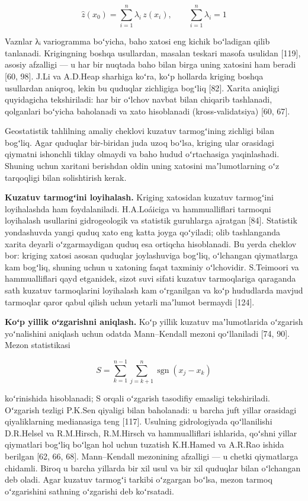 \begin{equation}\tag{1.4}
\hat{z}(x_0) = \sum_{i=1}^{n} \lambda_i \, z(x_i), \qquad \sum_{i=1}^{n} \lambda_i = 1
\end{equation}

Vaznlar λᵢ variogramma boʻyicha, baho xatosi eng kichik boʻladigan qilib
tanlanadi. Krigingning boshqa usullardan, masalan teskari masofa
usulidan {[}119{]}, asosiy afzalligi --- u har bir nuqtada baho bilan
birga uning xatosini ham beradi {[}60, 98{]}. J.Li va A.D.Heap sharhiga
koʻra, koʻp hollarda kriging boshqa usullardan aniqroq, lekin bu
quduqlar zichligiga bogʻliq {[}82{]}. Xarita aniqligi quyidagicha
tekshiriladi: har bir oʻlchov navbat bilan chiqarib tashlanadi,
qolganlari boʻyicha baholanadi va xato hisoblanadi (kross-validatsiya)
{[}60, 67{]}.

Geostatistik tahlilning amaliy cheklovi kuzatuv tarmogʻining zichligi
bilan bogʻliq. Agar quduqlar bir-biridan juda uzoq boʻlsa, kriging ular
orasidagi qiymatni ishonchli tiklay olmaydi va baho hudud oʻrtachasiga
yaqinlashadi. Shuning uchun xaritani berishdan oldin uning xatosini
maʼlumotlarning oʻz tarqoqligi bilan solishtirish kerak.

\textbf{Kuzatuv tarmogʻini loyihalash.} Kriging xatosidan kuzatuv
tarmogʻini loyihalashda ham foydalaniladi. H.A.Loáiciga va
hammualliflari tarmoqni loyihalash usullarini gidrogeologik va statistik
guruhlarga ajratgan {[}84{]}. Statistik yondashuvda yangi quduq xato eng
katta joyga qoʻyiladi; olib tashlanganda xarita deyarli oʻzgarmaydigan
quduq esa ortiqcha hisoblanadi. Bu yerda cheklov bor: kriging xatosi
asosan quduqlar joylashuviga bogʻliq, oʻlchangan qiymatlarga kam
bogʻliq, shuning uchun u xatoning faqat taxminiy oʻlchovidir. S.Teimoori
va hammualliflari qayd etganidek, sizot suvi sifati kuzatuv tarmoqlariga
qaraganda sath kuzatuv tarmoqlarini loyihalash kam oʻrganilgan va koʻp
hududlarda mavjud tarmoqlar qaror qabul qilish uchun yetarli maʼlumot
bermaydi {[}124{]}.

\textbf{Koʻp yillik oʻzgarishni aniqlash.} Koʻp yillik kuzatuv
maʼlumotlarida oʻzgarish yoʻnalishini aniqlash uchun odatda
Mann--Kendall mezoni qoʻllaniladi {[}74, 90{]}. Mezon statistikasi

\begin{equation}\tag{1.5}
S = \sum_{k=1}^{n-1} \sum_{j=k+1}^{n} \operatorname{sgn}(x_j - x_k)
\end{equation}

koʻrinishida hisoblanadi; S orqali oʻzgarish tasodifiy emasligi
tekshiriladi. Oʻzgarish tezligi P.K.Sen qiyaligi bilan baholanadi: u
barcha juft yillar orasidagi qiyaliklarning medianasiga teng {[}117{]}.
Usulning gidrologiyada qoʻllanilishi D.R.Helsel va R.M.Hirsch,
R.M.Hirsch va hammualliflari ishlarida, qoʻshni yillar qiymatlari
bogʻliq boʻlgan hol uchun tuzatish K.H.Hamed va A.R.Rao ishida berilgan
{[}62, 66, 68{]}. Mann--Kendall mezonining afzalligi --- u chetki
qiymatlarga chidamli. Biroq u barcha yillarda bir xil usul va bir xil
quduqlar bilan oʻlchangan deb oladi. Agar kuzatuv tarmogʻi tarkibi
oʻzgargan boʻlsa, mezon tarmoq oʻzgarishini sathning oʻzgarishi deb
koʻrsatadi.


